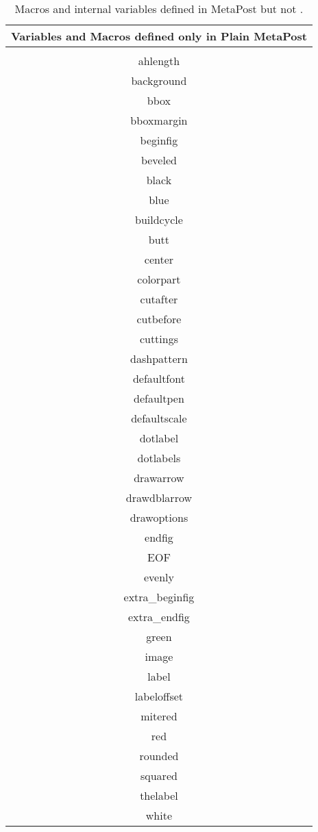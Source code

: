 \begin{table}
\begin{tabular}{|c|}
Variables and Macros defined only in Plain MetaPost\\\hline
\begin{minipage}[b]{.75\linewidth}\ttfamily
\begin{multicols}{3}
ahangle\\
ahlength\\
background\\
bbox\\
bboxmargin\\
beginfig\\
beveled\\
black\\
blue\\
buildcycle\\
butt\\
center\\
colorpart\\
cutafter\\
cutbefore\\
cuttings\\
dashpattern\\
defaultfont\\
defaultpen\\
defaultscale\\
dotlabel\\
dotlabels\\
drawarrow\\
drawdblarrow\\
drawoptions\\
endfig\\
EOF\\
evenly\\
extra\_beginfig\\
extra\_endfig\\
green\\
image\\
label\\
labeloffset\\
mitered\\
red\\
rounded\\
squared\\
thelabel\\
white
\end{multicols}
\end{minipage}\\\hline
\end{tabular}
\caption{Macros and internal variables defined in MetaPost but not \MF.}
\label{mponly}
\end{table}


